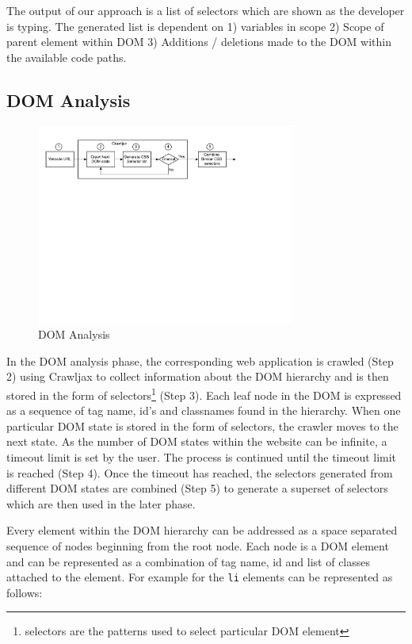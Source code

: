 	
		The output of our approach is a list of \css selectors which are shown as the developer is typing. The generated list is dependent on 1) \javascript variables in scope 2) Scope of parent element within DOM 3) Additions / deletions made to the DOM within the available code paths.
	
	\subsection{DOM Analysis}
	\label{Sec:DOM-Analysis}
		\begin{figure}
			\centering
			\includegraphics[width=85mm]{images/dom_analysis.pdf}
			\caption{DOM Analysis}
			\label{Fig:DOM-Analysis}
		\end{figure}
		In the DOM analysis phase, the corresponding web application is crawled (Step 2) using Crawljax \cite{crawljax:tweb12} to collect information about the DOM hierarchy and is then stored in the form of \css selectors\footnote{\css selectors are the patterns used to select particular DOM element} (Step 3). Each leaf node in the DOM is expressed as a sequence of tag name, id's and classnames found in the hierarchy. When one particular DOM state is stored in the form of \css selectors, the crawler moves to the next state. As the number of DOM states within the website can be infinite, a timeout limit is set by the user. The process is continued until the timeout limit is reached (Step 4). Once the timeout has reached, the \css selectors generated from different DOM states are combined (Step 5) to generate a superset of \css selectors which are then used in the later phase.
		
		Every element within the DOM hierarchy can be addressed as a space separated sequence of nodes beginning from the root node. Each node is a DOM element and can be represented as a combination of tag name, id and list of classes attached to the element. For example for  the \texttt{li} elements can be represented as follows:
			
